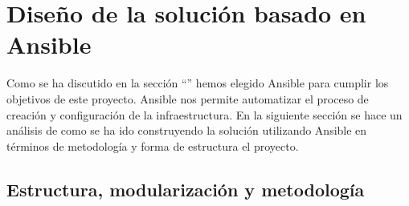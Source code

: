 \section{Diseño de la solución basado en Ansible}
\begin{text}
	Como se ha discutido en la sección ``'' hemos elegido Ansible para cumplir los objetivos de este proyecto. Ansible nos permite automatizar el proceso de creación y configuración de la infraestructura. En la siguiente sección se hace un análisis de como se ha ido construyendo la solución utilizando Ansible en términos de metodología y forma de estructura el proyecto.
\end{text}

\subsection{Estructura, modularización y metodología}
